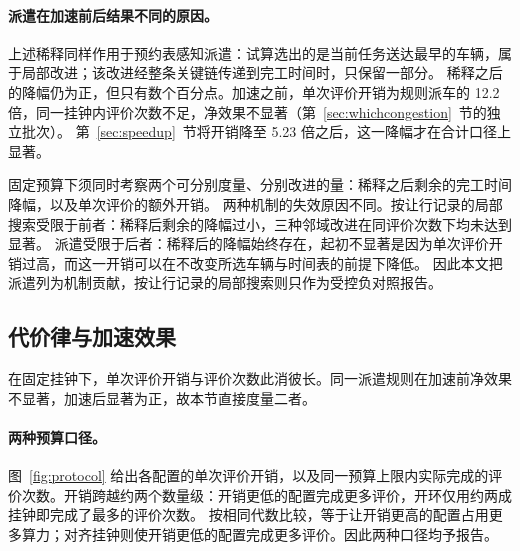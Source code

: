 \documentclass[manuscript,screen,review]{acmart}
\newcommand{\CostMultBefore}{12.2}
\newcommand{\CostMultAfter}{5.23}
\begin{document}
\paragraph{派遣在加速前后结果不同的原因。}
上述稀释同样作用于预约表感知派遣：试算选出的是当前任务送达最早的车辆，属于局部改进；该改进经整条关键链传递到完工时间时，只保留一部分。
稀释之后的降幅仍为正，但只有数个百分点。加速之前，单次评价开销为规则派车的 \CostMultBefore{} 倍，同一挂钟内评价次数不足，净效果不显著（第~\ref{sec:whichcongestion}~节的独立批次）。
第~\ref{sec:speedup}~节将开销降至 \CostMultAfter{} 倍之后，这一降幅才在合计口径上显著。

固定预算下须同时考察两个可分别度量、分别改进的量：稀释之后剩余的完工时间降幅，以及单次评价的额外开销。
两种机制的失效原因不同。按让行记录的局部搜索受限于前者：稀释后剩余的降幅过小，三种邻域改进在同评价次数下均未达到显著。
派遣受限于后者：稀释后的降幅始终存在，起初不显著是因为单次评价开销过高，而这一开销可以在不改变所选车辆与时间表的前提下降低。
因此本文把派遣列为机制贡献，按让行记录的局部搜索则只作为受控负对照报告。


\subsection{代价律与加速效果}
\label{sec:costlaw}

在固定挂钟下，单次评价开销与评价次数此消彼长。同一派遣规则在加速前净效果不显著，加速后显著为正，故本节直接度量二者。

\paragraph{两种预算口径。}
图~\ref{fig:protocol} 给出各配置的单次评价开销，以及同一预算上限内实际完成的评价次数。开销跨越约两个数量级：开销更低的配置完成更多评价，开环仅用约两成挂钟即完成了最多的评价次数。
按相同代数比较，等于让开销更高的配置占用更多算力；对齐挂钟则使开销更低的配置完成更多评价。因此两种口径均予报告。
\end{document}
